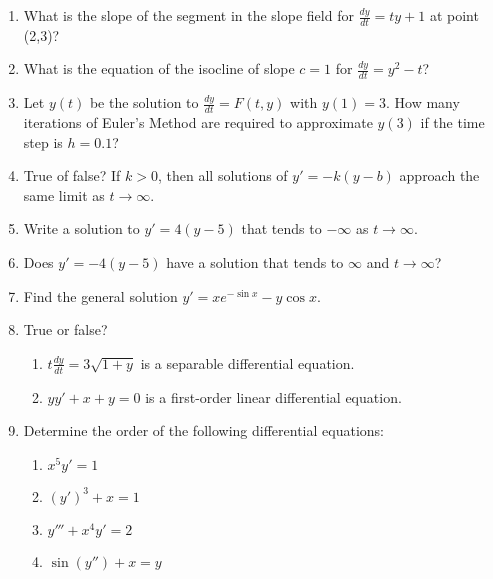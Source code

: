 \documentclass{nosvagor-notes}
\begin{document}
\begin{enumerate}
 \item What is the slope of the segment in the slope field for \(\frac{dy}{dt}
   = ty+1 \) at point (2,3)?
   \vspace{60pt}

  \item What is the equation of the isocline of slope \(c=1\) for
    \(\frac{dy}{dt} = y^2 -t\)?
    \vspace{60pt}

  \item Let \(y(t)\) be the solution to \(\frac{dy}{dt} = F(t,y)\) with
    \(y(1)=3\). How many iterations of Euler's Method are required to
    approximate \(y(3)\) if the time step is \(h=0.1\)?

  \newpage

  \item True of false? If \(k > 0\), then all solutions of \(y' = -k(y-b)\)
  approach the same limit as \(t \to \infty\).
  \vspace{60pt}

  \item Write a solution to \(y' = 4(y-5)\) that tends to \(-\infty\) as \(t\to
  \infty\).
  \vspace{90pt}

  \item Does \(y'=-4(y-5)\) have a solution that tends to \(\infty\) and \(t \to
  \infty\)?
  \vspace{90pt}

  \item Find the general solution \(y' = xe^{-\sin x} - y \cos x\).


  \newpage

  \item True or false?
  \begin{enumerate}
    \item \(t \frac{dy}{dt} = 3\sqrt{1+y} \) is a separable differential
      equation.
    \vspace{80pt}
    \item \(yy' + x + y = 0\) is a first-order linear differential equation.
    \vspace{80pt}
  \end{enumerate}

  \item Determine the order of the following differential equations:
    \begin{multicols}{2}
      \begin{enumerate}
        \item \(x^5y'=1\)
        \item \((y')^3+x=1\)
        \item \(y''' + x^4y' = 2\)
        \item \(\sin (y'') + x = y\)
      \end{enumerate}
    \end{multicols}
    \vspace{80pt}


\end{enumerate}
\end{document}
